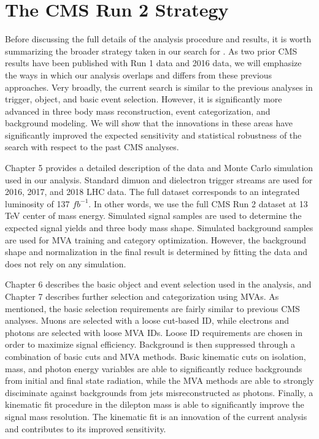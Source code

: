 \section{The CMS Run 2 Strategy}


Before discussing the full details of the analysis procedure and results, it is worth summarizing 
the broader strategy taken in our search for \hzg. As two prior CMS results have 
been published with Run 1 data and 2016 data, we will emphasize the ways in which our analysis
overlaps and differs from these previous approaches. Very broadly, the current search is 
similar to the previous analyses in trigger, object, and basic event selection. 
However, it is significantly more advanced in three body mass reconstruction, 
event categorization, and background modeling. We will show that the innovations in these 
areas have significantly improved the expected sensitivity and statistical robustness of the search 
with respect to the past CMS analyses.

Chapter 5 provides a detailed description of the data and Monte Carlo simulation 
used in our analysis. Standard dimuon and dielectron trigger streams are used for 2016, 2017, 
and 2018 LHC data. The full dataset corresponds to an integrated luminosity of 
137 $fb^{-1}$. In other words, we use the full CMS Run 2 dataset at 13 TeV center of 
mass energy. Simulated signal samples are used to determine the expected signal yields 
and three body mass shape. Simulated background samples are used for MVA training 
and category optimization. However, the background shape and normalization in the final result
is determined by fitting the data and does not rely on any simulation.

Chapter 6 describes the basic object and event selection used in the analysis, and Chapter 7 
describes further selection and categorization using MVAs. As mentioned, the basic 
selection requirements are fairly similar to previous CMS analyses. Muons are selected with 
a loose cut-based ID, while electrons and photons are selected with loose MVA IDs. Loose ID
requirements are chosen in order to maximize signal efficiency. Background is then suppressed 
through a combination of basic cuts and MVA methods. Basic kinematic cuts on isolation, mass, 
and photon energy variables are able to significantly reduce backgrounds from initial and final 
state radiation, while the MVA methods are able to strongly disciminate against backgrounds from 
jets misreconstructed as photons. Finally, a kinematic fit procedure in the dilepton mass 
is able to significantly improve the signal mass resolution. The kinematic fit is an 
innovation of the current analysis and contributes to its improved sensitivity.

